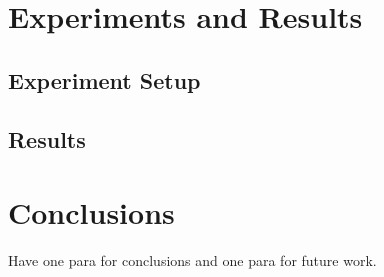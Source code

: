 \documentclass[conference]{IEEEtran}
\begin{document}
\section{Experiments and Results}

\subsection{Experiment Setup}

\subsection{Results}

\section{Conclusions}

Have one para for conclusions and one para for future work.



\end{document}
